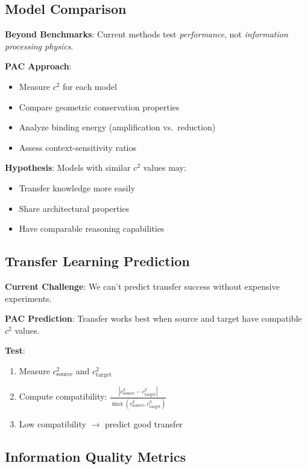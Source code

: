 \documentclass[11pt,a4paper]{article}
\begin{document}
\subsection{Model Comparison}

\textbf{Beyond Benchmarks}: Current methods test \emph{performance}, not \emph{information processing physics}.

\textbf{PAC Approach}:
\begin{itemize}
    \item Measure $c^2$ for each model
    \item Compare geometric conservation properties
    \item Analyze binding energy (amplification vs.\ reduction)
    \item Assess context-sensitivity ratios
\end{itemize}

\textbf{Hypothesis}: Models with similar $c^2$ values may:
\begin{itemize}
    \item Transfer knowledge more easily
    \item Share architectural properties
    \item Have comparable reasoning capabilities
\end{itemize}

\subsection{Transfer Learning Prediction}

\textbf{Current Challenge}: We can't predict transfer success without expensive experiments.

\textbf{PAC Prediction}: Transfer works best when source and target have compatible $c^2$ values.

\textbf{Test}: 
\begin{enumerate}
    \item Measure $c^2_{\text{source}}$ and $c^2_{\text{target}}$
    \item Compute compatibility: $\frac{|c^2_{\text{source}} - c^2_{\text{target}}|}{\max(c^2_{\text{source}}, c^2_{\text{target}})}$
    \item Low compatibility $\to$ predict good transfer
\end{enumerate}

\subsection{Information Quality Metrics}
\end{document}
